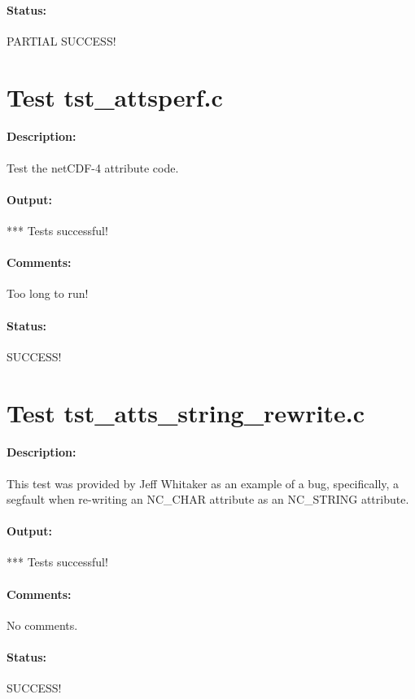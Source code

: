 \paragraph{Status:} PARTIAL SUCCESS!

\section{Test tst\_attsperf.c}

\paragraph{Description:} Test the netCDF-4 attribute code.

\paragraph{Output:} *** Tests successful!

\paragraph{Comments:} Too long to run!

\paragraph{Status:} SUCCESS!

\section{Test tst\_atts\_string\_rewrite.c}

\paragraph{Description:} This test was provided by Jeff Whitaker as an example of a bug, specifically, a segfault when re-writing an NC\_CHAR attribute as an NC\_STRING attribute.

\paragraph{Output:} *** Tests successful!

\paragraph{Comments:} No comments.

\paragraph{Status:} SUCCESS!

